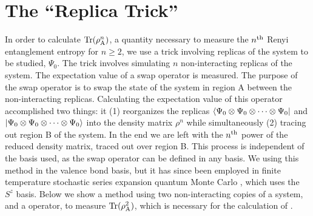 %
%
%
%

\section{The ``Replica Trick''}

In order to calculate ${\rm Tr}(\rho_{\rm A}^n)$, a quantity necessary to measure the $n^{\rm th}$ Renyi entanglement entropy for $n\ge2$, we use a trick involving replicas of the system to be studied, $\Psi_0$.
The trick involves simulating $n$ non-interacting replicas of the system.  
The expectation value of a swap operator is measured. 
The purpose of the swap operator is to swap the state of the system in region A between the non-interacting replicas.
Calculating the expectation value of this operator accomplished two things: it (1) reorganizes the replicas $\langle {\Psi_0 \otimes \Psi_0 \otimes \cdots \otimes \Psi_0} \rvert$ and $\lvert {\Psi_0 \otimes \Psi_0 \otimes \cdots \otimes \Psi_0} \rangle$ into the density matrix $\rho^n$ while simultaneously (2) tracing out region B of the system.
In the end we are left with the $n^{\rm th}$ power of the reduced density matrix, traced out over region B.
This process is independent of the basis used, as the swap operator can be defined in any basis.
We using this method in the valence bond basis, but it has since been employed in finite temperature stochastic series expansion quantum Monte Carlo \cite{kappa}, which uses the $S^z$ basis.
Below we show a method using two non-interacting copies of a system, and a \swa operator, to measure ${\rm Tr} (\rho^2_{\rm A})$, which is necessary for the calculation of \re.

